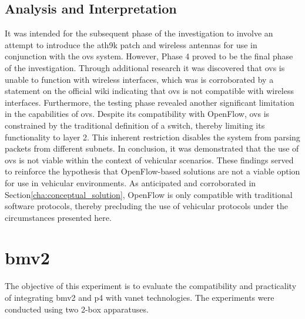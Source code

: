 \subsection{Analysis and Interpretation}
It was intended for the subsequent phase of the investigation to involve an attempt to introduce the ath9k patch and wireless antennas for use in conjunction with the \gls{ovs} system. However, Phase 4 proved to be the final phase of the investigation. Through additional research it was discovered that \gls{ovs} is unable to function with wireless interfaces, which was is corroborated by a statement on the official wiki\cite{noauthor_common_nodate} indicating that \gls{ovs} is not compatible with wireless interfaces.
Furthermore, the testing phase revealed another significant limitation in the capabilities of \gls{ovs}. Despite its compatibility with OpenFlow, \gls{ovs} is constrained by the traditional definition of a switch, thereby limiting its functionality to layer 2. This inherent restriction disables the system from parsing packets from different subnets.
In conclusion, it was demonstrated that the use of \gls{ovs} is not viable within the context of vehicular scenarios. These findings served to reinforce the hypothesis that OpenFlow-based solutions are not a viable option for use in vehicular environments. As anticipated and corroborated in Section\ref{cha:conceptual_solution}, OpenFlow is only compatible with traditional software protocols, thereby precluding the use of vehicular protocols under the circumstances presented here. 

\section[BMv2]{\gls{bmv2}}
The objective of this experiment is to evaluate the compatibility and practicality of integrating \gls{bmv2} and \gls{p4} with \gls{vanet} technologies. The experiments were conducted using two 2-box apparatuses.

